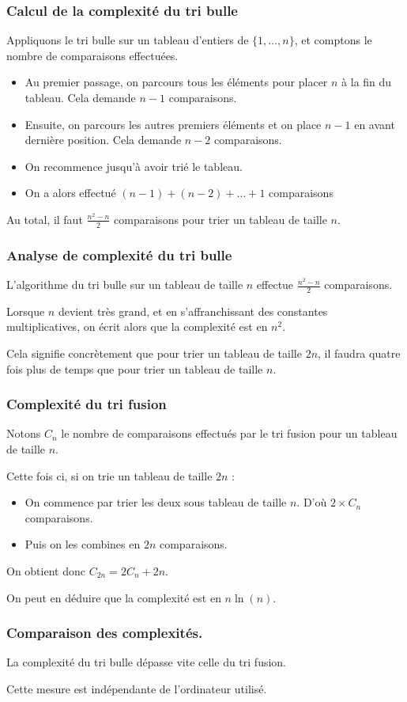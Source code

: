 \documentclass{beamer}
\begin{document}
\begin{frame}
\frametitle{Calcul de la complexité du tri bulle}

Appliquons le tri bulle sur un tableau d'entiers de $\{1, \ldots, n\}$, et comptons le nombre de comparaisons effectuées.
\pause
  \begin{itemize}
    \item Au premier passage, on parcours tous les éléments pour placer $n$ à la fin du tableau. Cela demande $n-1$ comparaisons.
    \item Ensuite, on parcours les autres premiers éléments et on place $n-1$ en avant dernière position. Cela demande $n-2$ comparaisons.
    \item On recommence jusqu'à avoir trié le tableau.
    \item On a alors effectué $(n-1) + (n-2) + \ldots + 1$ comparaisons
  \end{itemize}
\pause
Au total, il faut $\frac{n^2 - n}{2}$ comparaisons pour trier un tableau de taille $n$.

\end{frame}


\begin{frame}
\frametitle{Analyse de complexité du tri bulle}

L'algorithme du tri bulle sur un tableau de taille $n$ effectue $\frac{n^2-n}{2}$ comparaisons.

Lorsque $n$ devient très grand, et en s'affranchissant des constantes multiplicatives, on écrit alors que la complexité est en $n^2$.

\pause
Cela signifie concrètement que pour trier un tableau de taille $2 n$, il faudra quatre fois plus de temps que pour trier un tableau de taille $n$.

\end{frame}


\begin{frame}
\frametitle{Complexité du tri fusion}

Notons $C_n$ le nombre de comparaisons effectués par le tri fusion pour un tableau de taille $n$.

\pause
Cette fois ci, si on trie un tableau de taille $2n$ :
\begin{itemize}
  \item On commence par trier les deux sous tableau de taille $n$. D'où $2 \times C_n$ comparaisons.
  \item Puis on les combines en $2n$ comparaisons.
\end{itemize}
On obtient donc $C_{2n} = 2C_n + 2n$.

On peut en déduire que la complexité est en $n \ln(n)$.

\end{frame}


\begin{frame}
\frametitle{Comparaison des complexités.}

La complexité du tri bulle dépasse vite celle du tri fusion.

Cette mesure est indépendante de l'ordinateur utilisé.

\end{frame}
\end{document}
